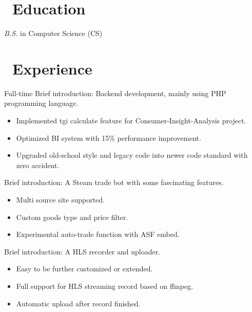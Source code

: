 \documentclass{resume}
\begin{document}



\section{\faGraduationCap\ Education}
\textit{B.S.} in Computer Science (CS)

\section{\faUsers\ Experience}
\role{Senior Software Engineer} {Full-time}
Brief introduction: Backend development, mainly using PHP programming language.
\begin{itemize}
  \item Implemented tgi calculate feature for Consumer-Insight-Analysis project.
  \item Optimized BI system with 15\% performance improvement.
  \item Upgraded old-school style and legacy code into newer code standard with zero accident.
\end{itemize}

Brief introduction: A Steam trade bot with some fascinating features.
\begin{itemize}
  \item Multi source site supported.
  \item Custom goods type and price filter.
  \item Experimental auto-trade function with ASF embed.
\end{itemize}

Brief introduction: A HLS recorder and uploader.
\begin{itemize}
  \item Easy to be further customized or extended.
  \item Full support for HLS streaming record based on  ffmpeg.
  \item Automatic upload after record finished.
\end{itemize}
\end{document}
